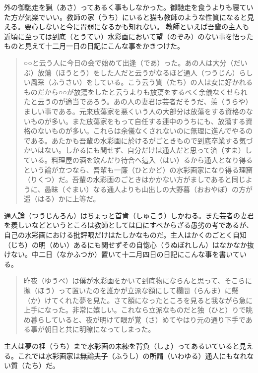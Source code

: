 \documentclass{book}
\begin{document}
外の御馳走を猟（あさ）ってあるく事もしなかった。御馳走を食うよりも寝ていた方が気楽でいい。教師の家（うち）にいると猫も教師のような性質になると見える。要心しないと今に胃弱になるかも知れない。
教師といえば吾輩の主人も近頃に至っては到底（とうてい）水彩画において望（のぞみ）のない事を悟ったものと見えて十二月一日の日記にこんな事をかきつけた。
\blockquote{○○と云う人に今日の会で始めて出逢（であ）った。あの人は大分（だいぶ）放蕩（ほうとう）をした人だと云うがなるほど通人（つうじん）らしい風采（ふうさい）をしている。こう云う質（たち）の人は女に好かれるものだから○○が放蕩をしたと云うよりも放蕩をするべく余儀なくせられたと云うのが適当であろう。あの人の妻君は芸者だそうだ、羨（うらや）ましい事である。元来放蕩家を悪くいう人の大部分は放蕩をする資格のないものが多い。また放蕩家をもって自任する連中のうちにも、放蕩する資格のないものが多い。これらは余儀なくされないのに無理に進んでやるのである。あたかも吾輩の水彩画に於けるがごときもので到底卒業する気づかいはない。しかるにも関せず、自分だけは通人だと思って済（すま）している。料理屋の酒を飲んだり待合へ這入（はい）るから通人となり得るという論が立つなら、吾輩も一廉（ひとかど）の水彩画家になり得る理窟（りくつ）だ。吾輩の水彩画のごときはかかない方がましであると同じように、愚昧（ぐまい）なる通人よりも山出しの大野暮（おおやぼ）の方が遥（はる）かに上等だ。}
通人論（つうじんろん）はちょっと首肯（しゅこう）しかねる。また芸者の妻君を羨しいなどというところは教師としては口にすべからざる愚劣の考であるが、自己の水彩画における批評眼だけはたしかなものだ。主人はかくのごとく自知（じち）の明（めい）あるにも関せずその自惚心（うぬぼれしん）はなかなか抜けない。中二日（なかふつか）置いて十二月四日の日記にこんな事を書いている。
\blockquote{昨夜（ゆうべ）は僕が水彩画をかいて到底物にならんと思って、そこらに抛（ほう）って置いたのを誰かが立派な額にして欄間（らんま）に懸（か）けてくれた夢を見た。さて額になったところを見ると我ながら急に上手になった。非常に嬉しい。これなら立派なものだと独（ひと）りで眺め暮らしていると、夜が明けて眼が覚（さ）めてやはり元の通り下手である事が朝日と共に明瞭になってしまった。}
主人は夢の裡（うち）まで水彩画の未練を背負（しょ）ってあるいていると見える。これでは水彩画家は無論夫子（ふうし）の所謂（いわゆる）通人にもなれない質（たち）だ。
\end{document}

